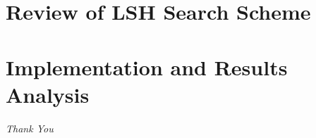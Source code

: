 \documentclass{beamer}
\begin{document}
	\section{Review of LSH Search Scheme}
	
	
	
	
	\section{Implementation and Results Analysis}
	
	\begin{frame}[allowframebreaks]
	
	
	\end{frame}
	
	\begin{frame}{}
  		\centering \LARGE
  		\emph{Thank You}
	\end{frame}
\end{document}
